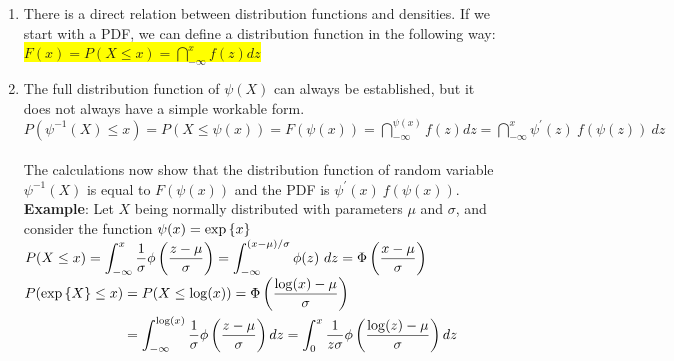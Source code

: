 \begin{enumerate}
    \item There is a direct relation between distribution functions and densities.
    If we start with a PDF, we can define a distribution function in the following way:
    \colorbox{yellow}{$
        F(x)
        = P(X \leq x)
        = \dint_{-\infty}^{x} f(z) dz
    $}
    \hfill \cite{statistics/book/Statistics-for-Data-Scientists/Maurits-Kaptein}

    \item The full distribution function of $\psi(X)$ can always be established, but it does not always have a simple workable form.
    \hfill \cite{statistics/book/Statistics-for-Data-Scientists/Maurits-Kaptein}
    \\[0.2cm]
    $
        P(\psi^{-1}(X) \leq x)
        = P(X \leq \psi(x))
        = F(\psi(x))
        =\dint_{-\infty}^{\psi(x)} f(z) dz
        =\dint_{-\infty}^{x} \psi^{\prime}(z)\ f(\psi(z))\ dz
    $
    \hfill \cite{statistics/book/Statistics-for-Data-Scientists/Maurits-Kaptein}
    \\[0.2cm]
    The calculations now show that the distribution function of random variable $\psi^{-1}(X)$ is equal to $F(\psi(x))$ and the PDF is $\psi^\prime(x)\ f (\psi(x))$.
    \hfill \cite{statistics/book/Statistics-for-Data-Scientists/Maurits-Kaptein}
    \\[0.5cm]
    \textbf{Example}: Let $X$ being normally distributed with parameters $\mu$ and $\sigma$, and consider the function $\psi(x) = \exp\left\{x\right\}$
    \hfill \cite{statistics/book/Statistics-for-Data-Scientists/Maurits-Kaptein}
    \\[0.2cm]
    $
        P(X \leq x)
        = \displaystyle\int_{-\infty}^{x} \dfrac{1}{\sigma} \phi\left(\dfrac{z - \mu}{\sigma}\right)
        = \displaystyle\int_{-\infty}^{(x - \mu)/\sigma} \phi(z)\ dz
        = \Phi\left(\dfrac{x - \mu}{\sigma}\right)
    $
    \hfill \cite{statistics/book/Statistics-for-Data-Scientists/Maurits-Kaptein}
    \\[0.2cm]
    $
        \begin{aligned}
            P(\exp\left\{X\right\} \leq x)
                &= P(X \leq \log(x))
                = \Phi\left(\dfrac{\log(x) - \mu}{\sigma}\right) \\
                &= \displaystyle\int_{-\infty}^{\log(x)} \dfrac{1}{\sigma} \phi\left(\dfrac{z - \mu}{\sigma}\right) dz
                = \displaystyle\int_{0}^{x} \dfrac{1}{z\sigma} \phi\left(\dfrac{\log(z) - \mu}{\sigma}\right) dz
        \end{aligned}
    $
    \hfill \cite{statistics/book/Statistics-for-Data-Scientists/Maurits-Kaptein}







\end{enumerate}
